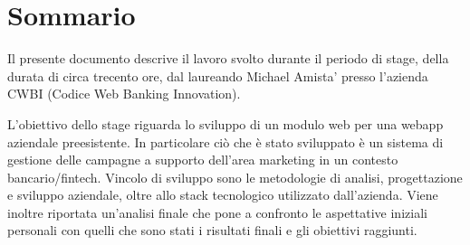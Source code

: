\cleardoublepage
{}
{}
\begingroup
\let\clearpage\relax
\let\cleardoublepage\relax
\let\cleardoublepage\relax

\chapter*{Sommario}
Il presente documento descrive il lavoro svolto durante il periodo di stage, della durata di circa trecento ore, dal laureando Michael Amista' presso l'azienda CWBI (Codice Web Banking Innovation).

\setlength{\parskip}{3ex}

\noindent L'obiettivo dello stage riguarda lo sviluppo di un modulo web per una webapp aziendale preesistente. In particolare ciò che è stato sviluppato è un sistema di gestione delle campagne a supporto dell'area marketing in un contesto bancario/fintech. Vincolo di sviluppo sono le metodologie di analisi, progettazione e sviluppo aziendale, oltre allo stack tecnologico utilizzato dall'azienda. Viene inoltre riportata un'analisi finale che pone a confronto le aspettative iniziali personali con quelli che sono stati i risultati finali e gli obiettivi raggiunti.

\endgroup

\vfill
